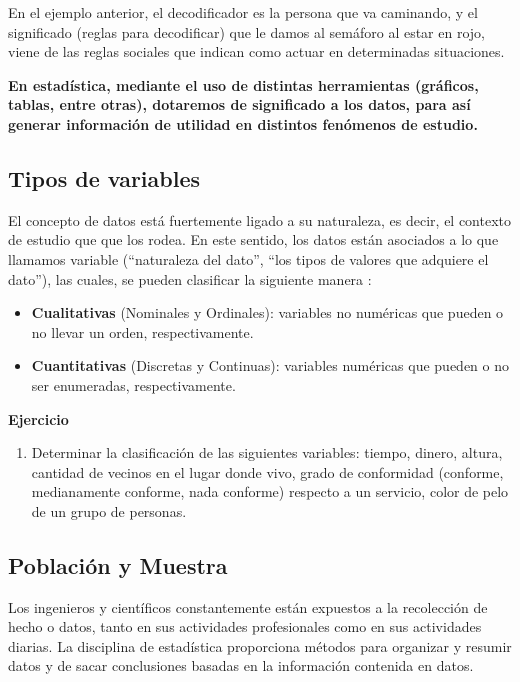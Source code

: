 \documentclass[
]{book}
\providecommand{\tightlist}{%
  \setlength{\itemsep}{0pt}\setlength{\parskip}{0pt}}
\begin{document}
En el ejemplo anterior, el decodificador es la persona que va caminando, y el significado (reglas para decodificar) que le damos al semáforo al estar en rojo, viene de las reglas sociales que indican como actuar en determinadas situaciones.

\textbf{En estadística, mediante el uso de distintas herramientas (gráficos, tablas, entre otras), dotaremos de significado a los datos, para así generar información de utilidad en distintos fenómenos de estudio.}

\hypertarget{tipos-de-variables}{%
\subsection{Tipos de variables}\label{tipos-de-variables}}

El concepto de datos está fuertemente ligado a su naturaleza, es decir, el contexto de estudio que que los rodea. En este sentido, los datos están asociados a lo que llamamos variable (``naturaleza del dato'', ``los tipos de valores que adquiere el dato''), las cuales, se pueden clasificar la siguiente manera \citep[página 7]{anderson}:

\begin{itemize}
\tightlist
\item
  \textbf{Cualitativas} (Nominales y Ordinales): variables no numéricas que pueden o no llevar un orden, respectivamente.
\item
  \textbf{Cuantitativas} (Discretas y Continuas): variables numéricas que pueden o no ser enumeradas, respectivamente.
\end{itemize}

\textbf{Ejercicio}

\begin{enumerate}
\def\labelenumi{\arabic{enumi}.}
\tightlist
\item
  Determinar la clasificación de las siguientes variables: tiempo, dinero, altura, cantidad de vecinos en el lugar donde vivo, grado de conformidad (conforme, medianamente conforme, nada conforme) respecto a un servicio, color de pelo de un grupo de personas.
\end{enumerate}

\hypertarget{poblaciuxf3n-y-muestra}{%
\subsection{Población y Muestra}\label{poblaciuxf3n-y-muestra}}

Los ingenieros y científicos constantemente están expuestos a la recolección de hecho o datos, tanto en sus actividades profesionales como en sus actividades diarias. La disciplina de estadística proporciona métodos para organizar y resumir datos y de sacar conclusiones basadas en la información contenida en datos.
\end{document}
